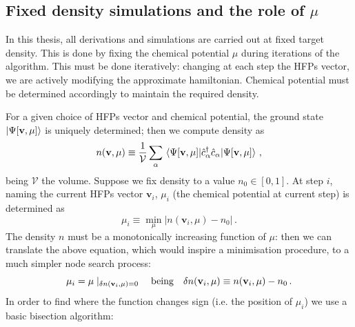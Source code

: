 \subsection{Fixed density simulations and the role of $\mu$}\label{subsec:fixed-density-role-mu}

In this thesis, all derivations and simulations are carried out at fixed target density. This is done by fixing the chemical potential $\mu$ during iterations of the algorithm. This must be done iteratively: changing at each step the HFPs vector, we are actively modifying the approximate hamiltonian. Chemical potential must be determined accordingly to maintain the required density. 

For a given choice of HFPs vector and chemical potential, the ground state $\ket{\Psi[\mathbf{v},\mu]}$ is uniquely determined; then we compute density as
\[
	n(\mathbf{v},\mu) \equiv \frac{1}{\mathcal{V}} \sum_{\alpha} \mel{\Psi[\mathbf{v},\mu]}{\hat c_\alpha^\dagger \hat c_\alpha}{\Psi[\mathbf{v},\mu]} \, ,
\]
being $\mathcal{V}$ the volume. Suppose we fix density to a value $n_0\in[0,1]$. At step $i$, naming the current HFPs vector $\mathbf{v}_i$, $\mu_i$ (the chemical potential at current step) is determined as
\begin{equation}\label{eq:mu-numerical-minimization}
	\mu_i \equiv
	\min_\mu \left|
	n(\mathbf{v}_i,\mu) - n_0
	\right| \, .
\end{equation}
The density $n$ must be a monotonically increasing function of $\mu$: then we can translate the above equation, which would inspire a minimisation procedure, to a much simpler node search process:
\[
	\mu_i = \mu \mid_{\delta n(\mathbf{v}_i,\mu) = 0}
	\qq{being}
	\delta n(\mathbf{v}_i,\mu) \equiv n(\mathbf{v}_i,\mu) - n_0 \, .
\]
In order to find where the function changes sign (i.e. the position of $\mu_i$) we use a basic bisection algorithm:
